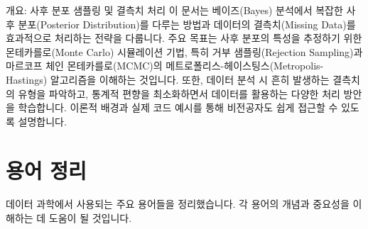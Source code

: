 \documentclass[11pt,a4paper]{article}
\begin{document}
\begin{summarybox}{개요: 사후 분포 샘플링 및 결측치 처리}
이 문서는 베이즈(Bayes) 분석에서 복잡한 사후 분포(Posterior Distribution)를 다루는 방법과 데이터의 결측치(Missing Data)를 효과적으로 처리하는 전략을 다룹니다.
주요 목표는 사후 분포의 특성을 추정하기 위한 몬테카를로(Monte Carlo) 시뮬레이션 기법, 특히 거부 샘플링(Rejection Sampling)과 마르코프 체인 몬테카를로(MCMC)의 메트로폴리스-헤이스팅스(Metropolis-Hastings) 알고리즘을 이해하는 것입니다.
또한, 데이터 분석 시 흔히 발생하는 결측치의 유형을 파악하고, 통계적 편향을 최소화하면서 데이터를 활용하는 다양한 처리 방안을 학습합니다.
이론적 배경과 실제 코드 예시를 통해 비전공자도 쉽게 접근할 수 있도록 설명합니다.
\end{summarybox}

\newpage
\section*{용어 정리}
데이터 과학에서 사용되는 주요 용어들을 정리했습니다. 각 용어의 개념과 중요성을 이해하는 데 도움이 될 것입니다.
\end{document}
